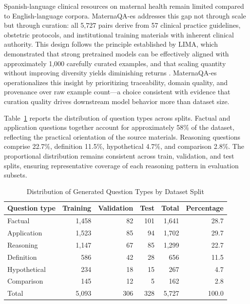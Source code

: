 \documentclass[conference]{IEEEtran}
\begin{document}
Spanish-language clinical resources on maternal health remain limited compared to English-language corpora. MaternaQA-es addresses this gap not through scale but through curation: all 5,727 pairs derive from 57 clinical practice guidelines, obstetric protocols, and institutional training materials with inherent clinical authority. This design follows the principle established by LIMA, which demonstrated that strong pretrained models can be effectively aligned with approximately 1,000 carefully curated examples, and that scaling quantity without improving diversity yields diminishing returns \cite{Zhou2023LIMA}. MaternaQA-es operationalizes this insight by prioritizing traceability, domain quality, and provenance over raw example count---a choice consistent with evidence that curation quality drives downstream model behavior more than dataset size.

Table~\ref{tab:question_types} reports the distribution of question types across splits. Factual and application questions together account for approximately 58\% of the dataset, reflecting the practical orientation of the source materials. Reasoning questions comprise 22.7\%, definition 11.5\%, hypothetical 4.7\%, and comparison 2.8\%. The proportional distribution remains consistent across train, validation, and test splits, ensuring representative coverage of each reasoning pattern in evaluation subsets.

\begin{table}[t]
\caption{Distribution of Generated Question Types by Dataset Split}
\label{tab:question_types}
\centering
\scriptsize
\setlength{\tabcolsep}{2pt}
\begin{tabular}{|p{}|r|r|r|r|r|}
\hline
\textbf{Question type} & \textbf{Training} & \textbf{Validation} & \textbf{Test} & \textbf{Total} & \textbf{Percentage} \\
\hline
Factual & 1,458 & 82 & 101 & 1,641 & 28.7 \\
Application & 1,523 & 85 & 94 & 1,702 & 29.7 \\
Reasoning & 1,147 & 67 & 85 & 1,299 & 22.7 \\
Definition & 586 & 42 & 28 & 656 & 11.5 \\
Hypothetical & 234 & 18 & 15 & 267 & 4.7 \\
Comparison & 145 & 12 & 5 & 162 & 2.8 \\
\hline
Total & 5,093 & 306 & 328 & 5,727 & 100.0 \\
\hline
\end{tabular}
\end{table}
\end{document}
